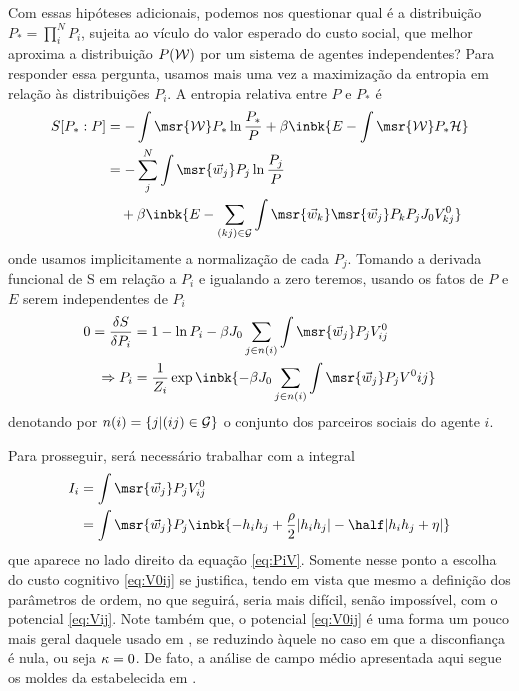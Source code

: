 Com essas hipóteses adicionais, podemos nos questionar qual é a
distribuição $P_* = \prod_i^N P_i$, sujeita ao vículo do valor
esperado do custo social, que melhor aproxima a distribuição $P(\mathcal{W})$
por um sistema de agentes independentes? Para responder essa pergunta,
usamos mais uma vez a maximização da entropia em relação às
distribuições $P_i$. A entropia relativa entre $P$ e $P_*$ é
\begin{align}
  S[P_*:P] & = -\int \msr{\MM} P_* \ln \frac{P_*}{P} 
               + \beta\inbk{E - \int\msr{\MM}P_*\cost} \notag\\
           & = -\sum_j^N\int\msr{\agt{j}}P_j\ln {P_j \over P} \notag\\
           & \quad + \beta\inbk{E-\sum_{(kj)\in\SG}\int\msr{\agt{k}}\msr{\agt{j}}P_kP_jJ_0V^0_{kj}} \label{eq:ent-P*}
\end{align}
onde usamos implicitamente a normalização de cada $P_j$. Tomando a
derivada funcional de S em relação a $P_i$ e igualando a zero teremos,
usando os fatos de $P$ e $E$ serem independentes de $P_i$
\begin{align}
   0 = {\delta S \over \delta P_i} & = 1 - \ln P_i -\beta J_0\sum_{j\in n(i)}\int\msr{\agt{j}}P_jV^0_{ij} \notag\\
  \Rightarrow P_i & = \frac{1}{Z_i}\exp\inbk{-\beta J_0 \sum_{j\in n(i)}\int \msr{\agt{j}}P_j V^0{ij}} \label{eq:PiV}
\end{align}
denotando por $n(i) = \{j | (ij)\in \mathcal{G} \}$ o conjunto dos parceiros
sociais do agente $i$. 

Para prosseguir, será necessário trabalhar com a integral
\begin{align}
  I_i & = \int \msr{\agt{j}}P_j V^0_{ij} \notag\\
      & = \int \msr{\agt{j}}P_j \inbk{-h_ih_j + \frac{\rho}{2}|h_ih_j| - \half|h_ih_j+\cutoff|} \label{eq:lnPiV}
\end{align}
que aparece no lado direito da equação \eqref{eq:PiV}. Somente nesse
ponto a escolha do custo cognitivo \eqref{eq:V0ij} se justifica, tendo
em vista que mesmo a definição dos parâmetros de ordem, no que
seguirá, seria mais difícil, senão impossível, com o potencial
\eqref{eq:Vij}.  Note também que, o potencial \eqref{eq:V0ij} é uma
forma um pouco mais geral daquele usado em \parencite{Caticha2011}, se
reduzindo àquele no caso em que a disconfiança é nula, ou seja $\kappa =
0$.  De fato, a análise de campo médio apresentada aqui segue os
moldes da estabelecida em \parencite{Caticha2011,Cesar2014}.


